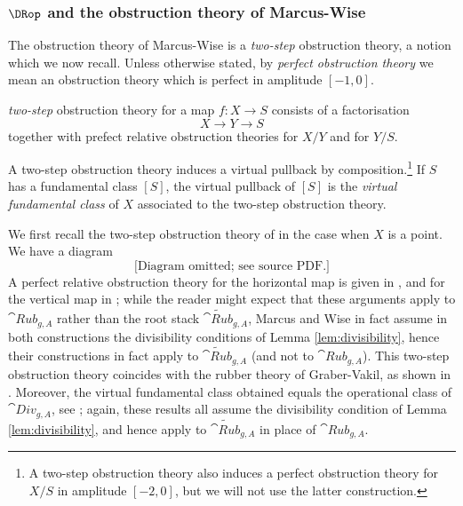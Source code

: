 \subsubsection{$\DRop$ and the obstruction theory of Marcus-Wise}
\label{kkkddd3}

The obstruction theory of Marcus-Wise is a \emph{two-step} obstruction theory, a notion which we now recall. Unless otherwise stated, by \emph{perfect obstruction theory} we mean an obstruction theory which is perfect in amplitude $[-1,0]$.

\begin{definition}
\notreadyA \emph{two-step} obstruction theory for a map $f\colon X \to S$ consists of a factorisation $$X \to Y \to S$$ together with
prefect relative obstruction theories for $X/Y$ and for $Y/S$.
\end{definition}
A two-step obstruction theory induces a virtual pullback by composition.{\footnote{A
two-step obstruction theory
also induces a perfect obstruction theory for $X/S$ in amplitude $[-2,0]$, but we
will not use the latter construction.}}
If $S$ has a fundamental class $[S]$, the virtual pullback of $[S]$
is the {\em virtual fundamental class} of $X$ associated to the
two-step obstruction theory.


We first recall the two-step obstruction theory of \cite{Marcus2017Logarithmic-com} in the case when $X$ is a point. We have a diagram
\begin{equation}
 \text{[Diagram omitted; see source PDF.]}
\end{equation}
A perfect relative obstruction theory for the horizontal map is given in \cite[]{Marcus2017Logarithmic-com}, and for the vertical map in \cite[Proposition ]{Marcus2017Logarithmic-com}; while the reader might expect that these arguments apply to $\cat{Rub}_{g,A}$ rather than the root stack $\widetilde{\cat{Rub}}_{g, A}$, Marcus and Wise in fact assume in both constructions the divisibility conditions of Lemma \ref{lem:divisibility}, hence their constructions in fact apply to $\widetilde{\cat{Rub}}_{g, A}$ (and not to $\cat{Rub}_{g, A}$). This two-step obstruction theory
coincides with the rubber theory of Graber-Vakil, as shown in \cite[Section ]{Marcus2017Logarithmic-com}.
Moreover, the virtual fundamental class obtained
equals the operational class of $\cat{Div}_{g,A}$, see \cite[]{Marcus2017Logarithmic-com}; again, these results all assume the divisibility condition of Lemma \ref{lem:divisibility}, and hence apply to $\widetilde{\cat{Rub}}_{g,A}$ in place of $\cat{Rub}_{g, A}$.

